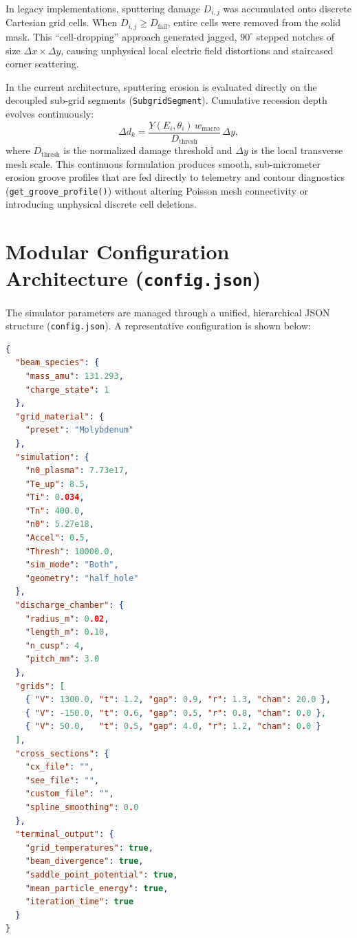 \documentclass[11pt,a4paper]{article}
\begin{document}
In legacy implementations, sputtering damage $D_{i,j}$ was accumulated onto discrete Cartesian grid cells. When $D_{i,j} \ge D_{\mathrm{fail}}$, entire cells were removed from the solid mask. This ``cell-dropping'' approach generated jagged, $90^\circ$ stepped notches of size $\Delta x \times \Delta y$, causing unphysical local electric field distortions and staircased corner scattering.

In the current architecture, sputtering erosion is evaluated directly on the decoupled sub-grid segments (\texttt{SubgridSegment}). Cumulative recession depth evolves continuously:
\begin{equation}
    \Delta d_k = \frac{Y(E_i, \theta_i) \, w_{\mathrm{macro}}}{D_{\mathrm{thresh}}} \, \Delta y,
\end{equation}
where $D_{\mathrm{thresh}}$ is the normalized damage threshold and $\Delta y$ is the local transverse mesh scale. This continuous formulation produces smooth, sub-micrometer erosion groove profiles that are fed directly to telemetry and contour diagnostics (\texttt{get\_groove\_profile()}) without altering Poisson mesh connectivity or introducing unphysical discrete cell deletions.

\section{Modular Configuration Architecture (\texttt{config.json})}

The simulator parameters are managed through a unified, hierarchical JSON structure (\texttt{config.json}). A representative configuration is shown below:

\begin{lstlisting}[language=json,caption={Standard \texttt{config.json} structure}]
{
  "beam_species": {
    "mass_amu": 131.293,
    "charge_state": 1
  },
  "grid_material": {
    "preset": "Molybdenum"
  },
  "simulation": {
    "n0_plasma": 7.73e17,
    "Te_up": 8.5,
    "Ti": 0.034,
    "Tn": 400.0,
    "n0": 5.27e18,
    "Accel": 0.5,
    "Thresh": 10000.0,
    "sim_mode": "Both",
    "geometry": "half_hole"
  },
  "discharge_chamber": {
    "radius_m": 0.02,
    "length_m": 0.10,
    "n_cusp": 4,
    "pitch_mm": 3.0
  },
  "grids": [
    { "V": 1300.0, "t": 1.2, "gap": 0.9, "r": 1.3, "cham": 20.0 },
    { "V": -150.0, "t": 0.6, "gap": 0.5, "r": 0.8, "cham": 0.0 },
    { "V": 50.0,   "t": 0.5, "gap": 4.0, "r": 1.2, "cham": 0.0 }
  ],
  "cross_sections": {
    "cx_file": "",
    "see_file": "",
    "custom_file": "",
    "spline_smoothing": 0.0
  },
  "terminal_output": {
    "grid_temperatures": true,
    "beam_divergence": true,
    "saddle_point_potential": true,
    "mean_particle_energy": true,
    "iteration_time": true
  }
}
\end{lstlisting}
\end{document}
